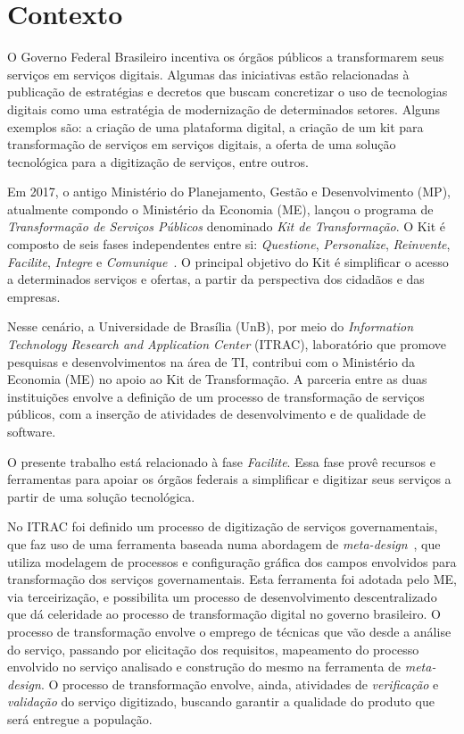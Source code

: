 \section{Contexto}

O Governo Federal Brasileiro incentiva os órgãos públicos a transformarem seus serviços em serviços digitais. Algumas das iniciativas estão relacionadas à publicação de estratégias e decretos que buscam concretizar o uso de tecnologias digitais como uma estratégia de modernização de determinados setores. Alguns exemplos são: a criação de uma plataforma digital, a criação de um kit para transformação de serviços em serviços digitais, a oferta de uma solução tecnológica para a digitização de serviços, entre outros. 

Em 2017, o antigo Ministério do Planejamento, Gestão e Desenvolvimento (MP), atualmente compondo o Ministério da Economia (ME), lançou o programa de \textit{Transformação de Serviços Públicos} denominado \textit{Kit de Transformação}. O Kit é composto de seis fases independentes entre si: \textit{Questione}, \textit{Personalize}, \textit{Reinvente}, \textit{Facilite}, \textit{Integre} e \textit{Comunique}~\cite{BRASIL2017}. O principal objetivo do Kit é simplificar o acesso a determinados serviços e ofertas, a partir da perspectiva dos cidadãos e das empresas.

Nesse cenário, a Universidade de Brasília (UnB), por meio do \textit{Information Technology Research and Application Center} (ITRAC), laboratório que promove pesquisas e desenvolvimentos na área de TI, contribui com o Ministério da Economia (ME) no apoio ao Kit de Transformação. A parceria entre as duas instituições envolve a definição de um processo de transformação de serviços públicos, com a inserção de atividades de desenvolvimento e de qualidade de software.

O presente trabalho está relacionado à fase \textit{Facilite}. Essa fase provê recursos e ferramentas para apoiar os órgãos federais a simplificar e digitizar seus serviços a partir de uma solução tecnológica.

No ITRAC foi definido um processo de digitização de serviços governamentais, que faz uso de uma ferramenta baseada numa abordagem de \textit{meta-design}~\cite{fogli2012meta}, que utiliza modelagem de processos e configuração gráfica dos campos envolvidos para transformação dos serviços governamentais. Esta ferramenta foi adotada pelo ME, via terceirização, e possibilita um processo de desenvolvimento descentralizado que dá celeridade ao processo de transformação digital no governo brasileiro. O processo de transformação envolve o emprego de técnicas que vão desde a análise do serviço, passando por elicitação dos requisitos, mapeamento do processo envolvido no serviço analisado e construção do mesmo na ferramenta de \textit{meta-design}. O processo de transformação envolve, ainda, atividades de \textit{verificação} e \textit{validação} do serviço digitizado, buscando garantir a qualidade do produto que será entregue a população.


